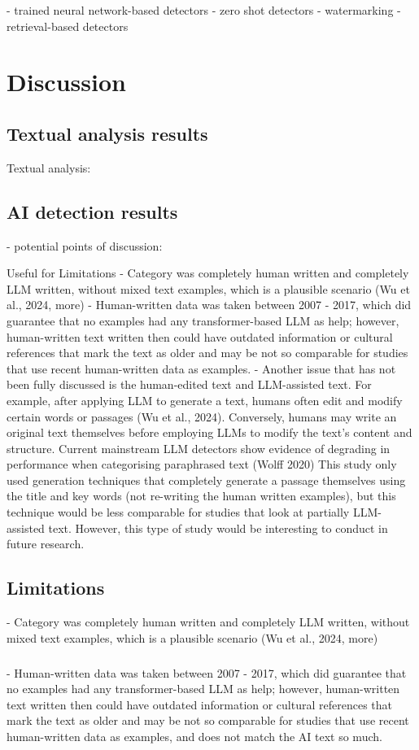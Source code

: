 \documentclass[thesis]{cluu}
\begin{document}
- trained neural network-based detectors
- zero shot detectors
- watermarking
- retrieval-based detectors

\chapter{Discussion}

\section{Textual analysis results}
Textual analysis:

\section{AI detection results}
- potential points of discussion:

Useful for Limitations
- Category was completely human written and completely LLM written, without mixed text examples, which is a plausible scenario (Wu et al., 2024, more)
- Human-written data was taken between 2007 - 2017, which did guarantee that no examples had any transformer-based LLM as help; however, human-written text written then could have outdated information or cultural references that mark the text as older and may be not so comparable for studies that use recent human-written data as examples. 
- Another issue that has not been fully discussed is the human-edited text and LLM-assisted text. For example, after applying LLM to generate a text, humans often edit and modify certain words or passages (Wu et al., 2024). Conversely, humans may write an original text themselves before employing LLMs to modify the text's content and structure. Current mainstream LLM detectors show evidence of degrading in performance when categorising paraphrased text (Wolff 2020) This study only used generation techniques that completely generate a passage themselves using the title and key words (not re-writing the human written examples), but this technique would be less comparable for studies that look at partially LLM-assisted text. However, this type of study would be interesting to conduct in future research. 

\section{Limitations}
- Category was completely human written and completely LLM written, without mixed text examples, which is a plausible scenario (Wu et al., 2024, more)
\paragraph{}
- Human-written data was taken between 2007 - 2017, which did guarantee that no examples had any transformer-based LLM as help; however, human-written text written then could have outdated information or cultural references that mark the text as older and may be not so comparable for studies that use recent human-written data as examples, and does not match the AI text so much.
\end{document}
